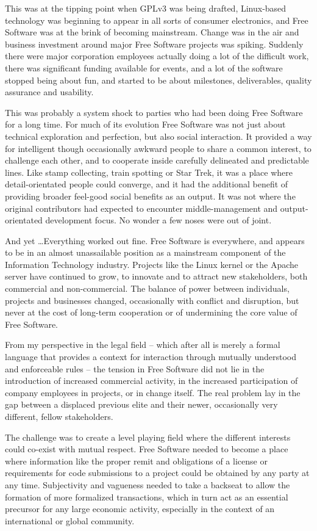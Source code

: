 This was at the tipping point when GPLv3 was being drafted, Linux-based
technology was beginning to appear in all sorts of consumer electronics, and
Free Software was at the brink of becoming mainstream. Change was in the air and
business investment around major Free Software projects was spiking. Suddenly
there were major corporation employees actually doing a lot of the difficult
work, there was significant funding available for events, and a lot of the
software stopped being about fun, and started to be about milestones,
deliverables, quality assurance and usability.

This was probably a system shock to parties who had been doing Free Software for
a long time. For much of its evolution Free Software was not just about
technical exploration and perfection, but also social interaction. It provided a
way for intelligent though occasionally awkward people to share a common
interest, to challenge each other, and to cooperate inside carefully delineated
and predictable lines. Like stamp collecting, train spotting or Star Trek, it
was a place where detail-orientated people could converge, and it had the
additional benefit of providing broader feel-good social benefits as an output.
It was not where the original contributors had expected to encounter
middle-management and output-orientated development focus. No wonder a few noses
were out of joint.

And yet \dots Everything worked out fine. Free Software is everywhere, and
appears to be in an almost unassailable position as a mainstream component of
the Information Technology industry. Projects like the Linux kernel or the
Apache server have continued to grow, to innovate and to attract new
stakeholders, both commercial and non-commercial. The balance of power between
individuals, projects and businesses changed, occasionally with conflict and
disruption, but never at the cost of long-term cooperation or of undermining the
core value of Free Software.

From my perspective in the legal field -- which after all is merely a formal
language that provides a context for interaction through mutually understood and
enforceable rules -- the tension in Free Software did not lie in the
introduction of increased commercial activity, in the increased participation of
company employees in projects, or in change itself. The real problem lay in the
gap between a displaced previous elite and their newer, occasionally very
different, fellow stakeholders.

The challenge was to create a level playing field where the different interests
could co-exist with mutual respect. Free Software needed to become a place where
information like the proper remit and obligations of a license or requirements
for code submissions to a project could be obtained by any party at any time.
Subjectivity and vagueness needed to take a backseat to allow the formation of
more formalized transactions, which in turn act as an essential precursor for
any large economic activity, especially in the context of an international or
global community.

